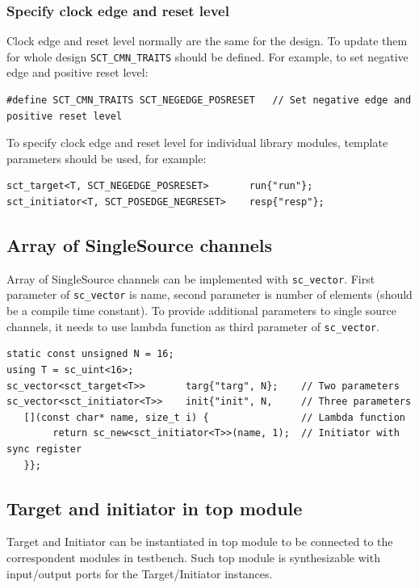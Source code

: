 \subsubsection{Specify clock edge and reset level}

Clock edge and reset level normally are the same for the design. To update them for whole design {\tt SCT\_CMN\_TRAITS} should be defined. For example, to set negative edge and positive reset level:
\begin{lstlisting}[style=mycpp]
#define SCT_CMN_TRAITS SCT_NEGEDGE_POSRESET   // Set negative edge and positive reset level
\end{lstlisting}

To specify clock edge and reset level for individual library modules, template parameters should be used, for example:
\begin{lstlisting}[style=mycpp]
sct_target<T, SCT_NEGEDGE_POSRESET>       run{"run"};
sct_initiator<T, SCT_POSEDGE_NEGRESET>    resp{"resp"};
\end{lstlisting}


\subsection{Array of SingleSource channels}

Array of SingleSource channels can be implemented with {\tt sc\_vector}. First parameter of {\tt sc\_vector} is name, second parameter is number of elements (should be a compile time constant). To provide additional parameters to single source channels, it needs to use lambda function as third parameter of {\tt sc\_vector}.

\begin{lstlisting}[style=mycpp]
static const unsigned N = 16;
using T = sc_uint<16>;
sc_vector<sct_target<T>>       targ{"targ", N};    // Two parameters 
sc_vector<sct_initiator<T>>    init{"init", N,     // Three parameters
   [](const char* name, size_t i) {                // Lambda function         
        return sc_new<sct_initiator<T>>(name, 1);  // Initiator with sync register
   }}; 
\end{lstlisting}

\subsection{Target and initiator in top module}

Target and Initiator can be instantiated in top module to be connected to the correspondent modules in testbench. Such top module is synthesizable with input/output ports for the Target/Initiator instances.

